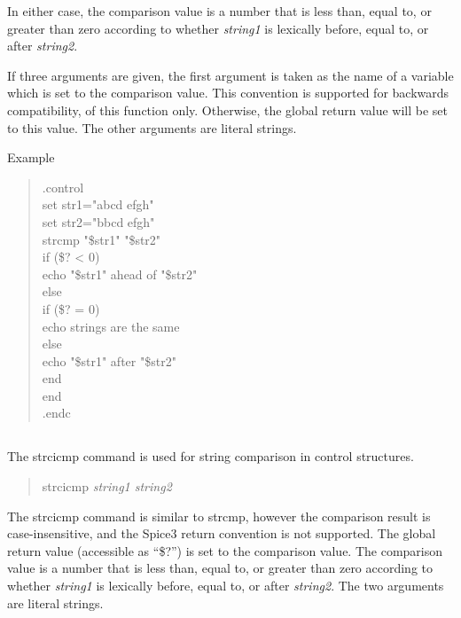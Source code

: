 In either case, the comparison value is a number that is less than,
equal to, or greater than zero according to whether {\it string1} is
lexically before, equal to, or after {\it string2\/}.

If three arguments are given, the first argument is taken as the name
of a variable which is set to the comparison value.  This convention
is supported for backwards compatibility, of this function only. 
Otherwise, the global return value will be set to this value.  The
other arguments are literal strings.

Example
\begin{quote}\vt
.control\\
set str1="abcd efgh"\\
set str2="bbcd efgh"\\
strcmp "\$str1" "\$str2"\\
if (\$? < 0)\\
\hspace*{2em}echo "\$str1" ahead of "\$str2"\\    
else\\
if (\$? = 0)\\
\hspace*{2em}echo strings are the same\\    
else\\
\hspace*{2em}echo "\$str1" after "\$str2"\\    
end\\
end\\
.endc
\end{quote}

\subsection{}


The {\cb strcicmp} command is used for string comparison in control
structures.
\begin{quote}\vt
strcicmp {\it string1 string2}
\end{quote}
The {\cb strcicmp} command is similar to {\cb strcmp}, however the
comparison result is case-insensitive, and the Spice3 return
convention is not supported.  The global return value (accessible as
``{\vt \$?}'') is set to the comparison value.  The comparison value
is a number that is less than, equal to, or greater than zero
according to whether {\it string1} is lexically before, equal to, or
after {\it string2}.  The two arguments are literal strings.

